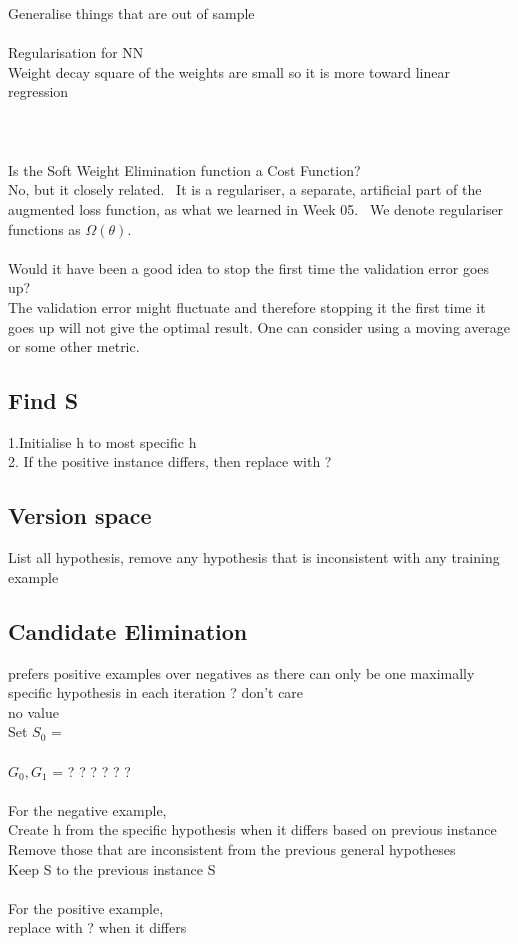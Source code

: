 \documentclass[11pt]{article}
\begin{document}
Generalise things that are out of sample\\
\\
Regularisation for NN\\
Weight decay square of the weights are small so it is more toward linear regression \\
\\
\\
\\
Is the Soft Weight Elimination function a Cost Function?\\
No, but it closely related.  It is a regulariser, a separate, artificial part of the augmented loss function, as what we learned in Week 05.  We denote regulariser functions as $\Omega(\theta)$.
\\\\
Would it have been a good idea to stop the first time the validation error goes up?\\
The validation error might fluctuate and therefore stopping it the first time it goes up will not give the optimal result. One can consider using a moving average or some other metric.\\
\subsection*{Find S}
1.Initialise h to most specific h\\
2. If the positive instance differs, then replace with ?
\subsection*{Version space}
List all hypothesis, remove any hypothesis that is inconsistent with any training example
\subsection*{Candidate Elimination}
prefers positive examples over negatives as there can only be one maximally specific hypothesis in each iteration
? don't care\\
\empty no value\\
Set $S_{0}$ = \langle \emptyset \emptyset \emptyset \emptyset \emptyset \emptyset \rangle\\
\\
$G_{0}, G_{1}$ = \langle ? ? ? ? ? ? \rangle\\
\\
\)
For the negative example,\\
Create h from the specific hypothesis when it differs based on previous instance\\
Remove those that are inconsistent from the previous general hypotheses\\
Keep S to the previous instance S
\\\\
For the positive example,\\
replace with ? when it differs
\\
\end{document}
